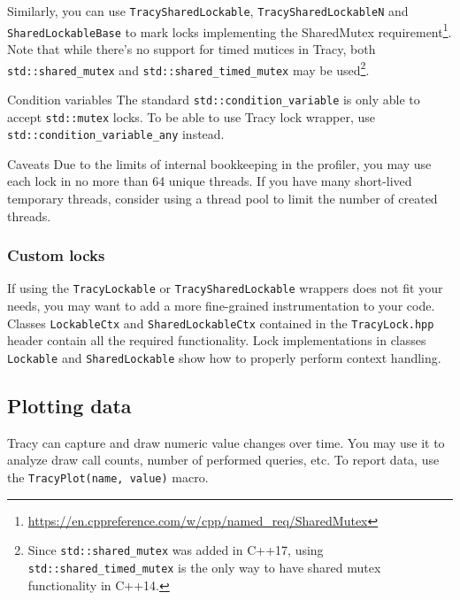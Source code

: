 \documentclass[hidelinks,titlepage,a4paper,twoside]{article}
\begin{document}
Similarly, you can use \texttt{TracySharedLockable}, \texttt{TracySharedLockableN} and \texttt{SharedLockableBase} to mark locks implementing the SharedMutex requirement\footnote{\url{https://en.cppreference.com/w/cpp/named_req/SharedMutex}}. Note that while there's no support for timed mutices in Tracy, both \texttt{std::shared\_mutex} and \texttt{std::shared\_timed\_mutex} may be used\footnote{Since \texttt{std::shared\_mutex} was added in C++17, using \texttt{std::shared\_timed\_mutex} is the only way to have shared mutex functionality in C++14.}.

\begin{bclogo}[
noborder=true,
couleur=black!5,
logo=\bclampe
]{Condition variables}
The standard \texttt{std::condition\_variable} is only able to accept \texttt{std::mutex} locks. To be able to use Tracy lock wrapper, use \texttt{std::condition\_variable\_any} instead.
\end{bclogo}

\begin{bclogo}[
noborder=true,
couleur=black!5,
logo=\bcattention
]{Caveats}
Due to the limits of internal bookkeeping in the profiler, you may use each lock in no more than 64 unique threads. If you have many short-lived temporary threads, consider using a thread pool to limit the number of created threads.
\end{bclogo}

\subsubsection{Custom locks}

If using the \texttt{TracyLockable} or \texttt{TracySharedLockable} wrappers does not fit your needs, you may want to add a more fine-grained instrumentation to your code. Classes \texttt{LockableCtx} and \texttt{SharedLockableCtx} contained in the \texttt{TracyLock.hpp} header contain all the required functionality. Lock implementations in classes \texttt{Lockable} and \texttt{SharedLockable} show how to properly perform context handling.

\subsection{Plotting data}
\label{plottingdata}

Tracy can capture and draw numeric value changes over time. You may use it to analyze draw call counts, number of performed queries, etc. To report data, use the \texttt{TracyPlot(name, value)} macro.
\end{document}
